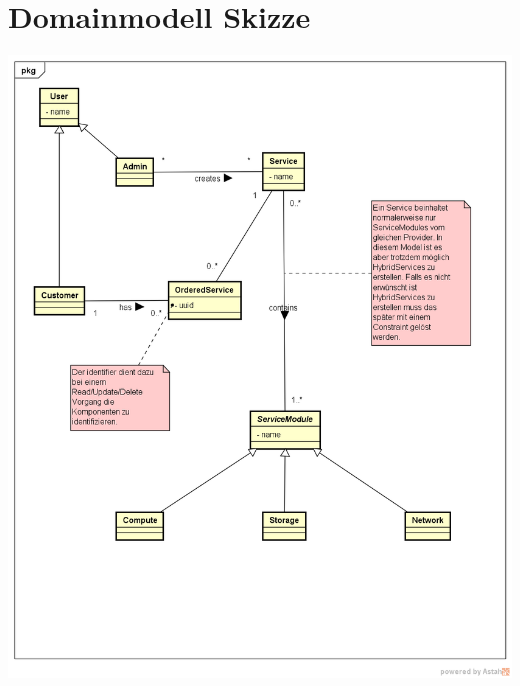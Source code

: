 \section{Domainmodell Skizze}

\includegraphics[width=\textwidth]{./03_Analyse/05_DomainModel/images/SDDC-DomainModel}